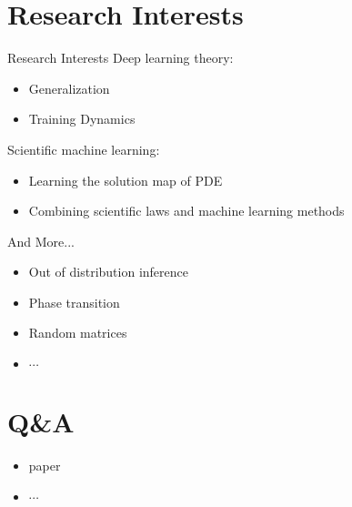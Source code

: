 \documentclass{beamer}
\begin{document}
\section{Research Interests}
\begin{frame}{Research Interests}
  Deep learning theory:
  \begin{itemize}
    \item Generalization
    \item Training Dynamics
  \end{itemize}
  Scientific machine learning:
  \begin{itemize}
    \item Learning the solution map of PDE 
    \item Combining scientific laws and machine learning methods
  \end{itemize}
  And More...
  \begin{itemize}
    \item Out of distribution inference
    \item Phase transition
    \item Random matrices
    \item $\cdots$
  \end{itemize}
\end{frame}

\section{Q\&A}

\begin{frame}
  \begin{itemize}
    \item paper
    \item $\cdots$
  \end{itemize}
\end{frame}
\end{document}
